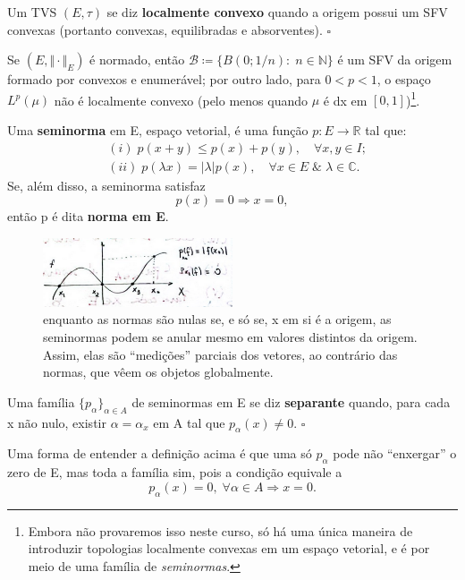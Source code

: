 \documentclass[../distribution_theory_notes.tex]{subfiles}
\begin{document}
  \begin{def*}
    Um TVS \((E,  \tau )\) se diz \textbf{localmente convexo} quando a origem possui um SFV convexas (portanto convexas, equilibradas e absorventes). \(\square\)
  \end{def*}
 \begin{example}
   Se \((E, \Vert \cdot  \Vert_{E})\) é normado, então \(\mathcal{B}\coloneqq \{B(0; 1/n):\; n\in \mathbb{N}\}\) é um SFV da origem formado por convexos e enumerável; por outro lado, para \(0<p<1\), o espaço \(L^{p}(\mu )\) não é localmente convexo (pelo menos quando \(\mu \) é dx em \([0, 1]\))\footnote{Embora não provaremos isso neste curso, só há uma única maneira de introduzir topologias localmente convexas em um espaço vetorial, e é por meio de uma família de \textit{seminormas}.}. 
 \end{example}
\begin{def*}
  Uma \textbf{seminorma} em E, espaço vetorial, é uma função \(p:E\rightarrow \mathbb{R}\) tal que:
 \begin{align*}
   &(i)\; p(x+y)\leq p(x)+p(y),\quad \forall x, y\in I;\\ 
   &(ii)\; p(\lambda x)=|\lambda |p(x),\quad \forall x\in E\;\&\;\lambda \in \mathbb{C}.
 \end{align*}
 Se, além disso, a seminorma satisfaz 
   \[
     p(x)=0\Rightarrow x=0, 
   \]
   então  p é dita \textbf{norma em E}.
\end{def*}
\begin{figure}[H]
\begin{center}
\includegraphics[height=0.5\textheight, width=0.5\textwidth, keepaspectratio]{./Images/seminorm_02.png}
\end{center}
\caption{enquanto as normas são nulas se, e só se, x em si é a origem, as seminormas podem se anular mesmo em valores distintos da origem. Assim, elas são ``medições'' parciais dos vetores, ao contrário das normas, que vêem os objetos globalmente.}
\end{figure}
\begin{def*}
  Uma família \(\{p_{\alpha }\}_{\alpha \in A}\) de seminormas em E se diz \textbf{separante} quando, para cada x não nulo, existir \(\alpha =\alpha_{x}\) em A tal que \(p_{\alpha }(x)\neq 0\). \(\square\)
\end{def*}
Uma forma de entender a definição acima é que uma só \(p_{\alpha }\) pode não ``enxergar'' o zero de E, mas toda a família sim, pois a condição equivale a 
  \[
    p_{\alpha }(x)=0,\; \forall \alpha \in A \Rightarrow x=0.
  \]
\end{document}
